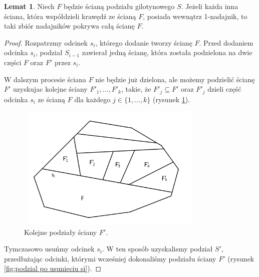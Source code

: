 \documentclass[brudnopis]{xmgr}
\theoremstyle{definition}
\newtheorem{Lemat}{Lemat}
\begin{document}
\begin{Lemat}\label{sasiednie sciany strzega F} \cite{knadajniki}
  Niech $F$ będzie ścianą podziału gilotynowego $S$. Jeżeli każda inna ściana, która współdzieli krawędź ze ścianą $F$, posiada wewnątrz 1-nadajnik, to taki zbiór nadajników pokrywa całą ścianę $F$.
\end{Lemat}
\begin{proof}
\indent Rozpatrzmy odcinek $s_i$, którego dodanie tworzy ścianę $F$. Przed dodaniem odcinka $s_i$, podział $S_{i-1}$ zawierał jedną ścianę, która została podzielona na dwie części $F$ oraz $F'$ przez $s_i$. 

W dalszym procesie ściana $F$ nie będzie już dzielona, ale możemy podzielić ścianę $F'$ uzyskujac kolejne ściany $F'_1, \ldots, F'_k$, takie, że $F'_j \subseteq F'$ oraz $F'_j$ dzieli część odcinka $s_i$ ze ścianą $F$ dla każdego $j \in \{1,\ldots,k\}$ (rysunek \ref{fig:podzial F' na kolejne ściany}).

\begin{figure}[ht!]
  \centering
  \includegraphics[width=9cm,height=6cm]{rysunki/podzial_F'.png}
  \caption{Kolejne podziały ściany $F'$.}
  \label{fig:podzial F' na kolejne ściany}
\end{figure} 
Tymczasowo usuńmy odcinek $s_i$. W ten sposób uzyskalismy podział $S'$, przedłużając odcinki, którymi wcześniej dokonaliśmy podziału ściany $F'$ (rysunek \ref{fig:podzial po usunieciu si}).


\end{proof}
\end{document}
